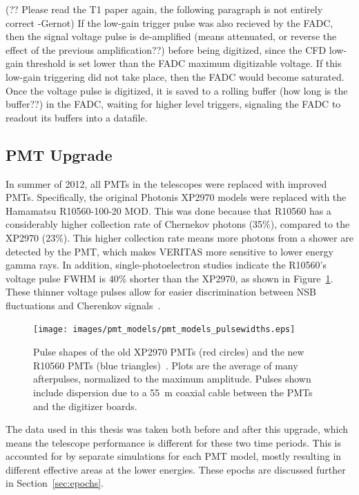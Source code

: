 {\color{red}(?? Please read the T1 paper again, the following paragraph is not entirely correct -Gernot)}
If the low-gain trigger pulse was also recieved by the FADC, then the signal voltage pulse is de-amplified {\color{red}(means attenuated, or reverse the effect of the previous amplification??)} before being digitized, since the CFD low-gain threshold is set lower than the FADC maximum digitizable voltage.
If this low-gain triggering did not take place, then the FADC would become saturated.
Once the voltage pulse is digitized, it is saved to a rolling buffer {\color{red}(how long is the buffer??)} in the FADC, waiting for higher level triggers, signaling the FADC to readout its buffers into a datafile.

\subsection{PMT Upgrade}
In summer of 2012, all PMTs in the telescopes were replaced with improved PMTs.
Specifically, the original Photonis XP2970 models were replaced with the Hamamatsu R10560-100-20 MOD.
This was done because that R10560 has a considerably higher collection rate of Chernekov photons (35\%), compared to the XP2970 (23\%).
This higher collection rate means more photons from a shower are detected by the PMT, which makes VERITAS more sensitive to lower energy gamma rays.
In addition, single-photoelectron studies indicate the R10560's voltage pulse FWHM is \nicetilde{}40\% shorter than the XP2970, as shown in Figure~\ref{fig:pmt_pulse_widths}.
These thinner voltage pulses allow for easier discrimination between NSB fluctuations and Cherenkov signals~\cite{pmtmodels}.

\begin{figure}[ht]
  \centering
  \texttt{[image: images/pmt\_models/pmt\_models\_pulsewidths.eps]}
  \caption[Pulse Shapes]{
    Pulse shapes of the old XP2970 PMTs (red circles) and the new R10560 PMTs (blue triangles)~\cite{pmtmodels}.
    Plots are the average of many afterpulses, normalized to the maximum amplitude.
    Pulses shown include dispersion due to a \nicetilde{}\SI{55}{m} coaxial cable between the PMTs and the digitizer boards.}
  \label{fig:pmt_pulse_widths}
\end{figure}

The data used in this thesis was taken both before and after this upgrade, which means the telescope performance is different for these two time periods.
This is accounted for by separate simulations for each PMT model, mostly resulting in different effective areas at the lower energies.
These epochs are discussed further in Section~\ref{sec:epochs}.


